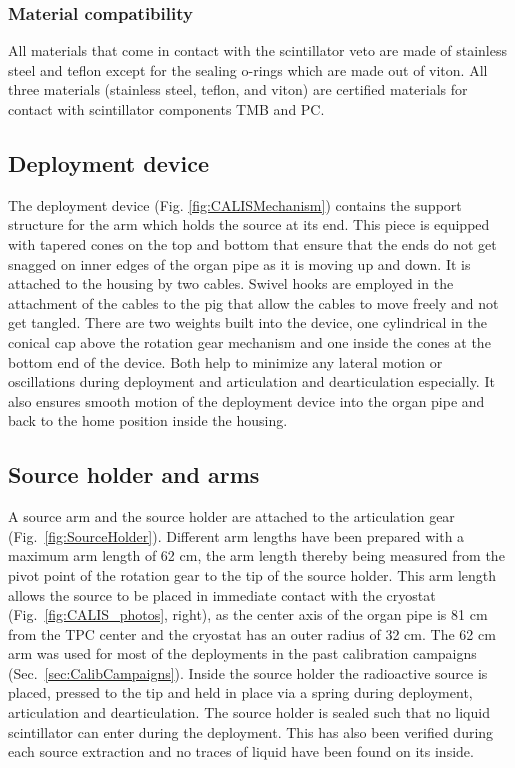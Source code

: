 \subsubsection*{Material compatibility}
All materials that come in contact with the scintillator veto are made of stainless steel and teflon except for the sealing o-rings which are made out of viton.  All three materials (stainless steel, teflon, and viton) are certified materials for contact with scintillator components TMB and PC.

\subsection{Deployment device}
The deployment device (Fig. \ref{fig:CALISMechanism}) contains the support structure for the arm which holds the source at its end. This piece is equipped with tapered cones on the top and bottom that ensure that the ends do not get snagged on inner edges of the organ pipe as it is moving up and down. It is attached to the housing by two cables.  Swivel hooks are employed in the attachment of the cables to the pig that allow the cables to move freely and not get tangled. 
There are two weights built into the device, one cylindrical in the conical cap above the rotation gear mechanism and one inside the cones at the bottom end of the device. Both help to minimize any lateral motion or oscillations during deployment and articulation and dearticulation especially. It also ensures smooth motion of the deployment device into the organ pipe and back to the home position inside the housing.

\subsection{Source holder and arms}
A source arm and the source holder are attached to the articulation gear (Fig.~\ref{fig:SourceHolder}). Different arm lengths have been prepared with a maximum arm length of 62 cm, the arm length thereby being measured from the pivot point of the rotation gear to the tip of the source holder. This arm length allows the source to be placed in immediate contact with the cryostat (Fig.~\ref{fig:CALIS_photos}, right), as the center axis of the organ pipe is 81 cm from the TPC center and the cryostat has an outer radius of 32 cm. The 62 cm arm was used for most of the deployments in the past calibration campaigns (Sec.~\ref{sec:CalibCampaigns}). Inside the source holder the radioactive source is placed, pressed to the tip and held in place via a spring during deployment, articulation and dearticulation. The source holder is sealed such that no liquid scintillator can enter during the deployment. This has also been verified during each source extraction and no traces of liquid have been found on its inside.

